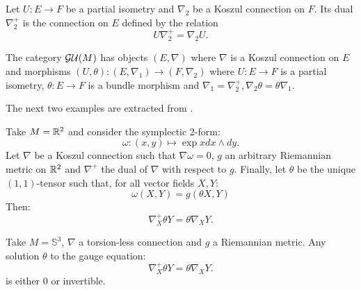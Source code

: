 \begin{defn}
\label{def:general_dual_connections}
Let $U \colon E \to F$ be a partial isometry and $\nabla_2$ be a Koszul connection on $F$. Its dual $\nabla_2^+$ is the connection on $E$ defined by the relation
\begin{equation}
    \label{eq:general_dual_connections}
    U \nabla_2^+ = \nabla_2 U.
\end{equation}
\end{defn}
\begin{defn}
    \label{def:category_gauge_dual}
    The category $\mathcal{GU}(M)$ has objects $(E,\nabla)$ where $\nabla$ is a Koszul connection on $E$ and morphisms $(U, \theta) \colon (E, \nabla_1) \to (F, \nabla_2)$ where $U \colon E \to F$ is a partial isometry, $\theta \colon E \to F$ is a bundle morphism and $\nabla_1 = \nabla_2^+, \nabla_2 \theta = \theta \nabla_1.$
\end{defn}
The next two examples are extracted from \cite{boyom2024}. 
\begin{ex}
    Take $M = \mathbb{R}^2$ and consider the symplectic 2-form:
    \begin{equation}
        \omega \colon (x,y) \mapsto \exp{x} dx \wedge dy.
    \end{equation}
    Let $\nabla$ be a Koszul connection such that $\nabla \omega = 0$, $g$ an arbitrary Riemannian metric on $\mathbb{R}^2$ and $\nabla^+$ the dual of $\nabla$ with respect to $g$. Finally, let $\theta$ be the unique $(1,1)$-tensor such that, for all vector fields $X,Y$:
    \begin{equation}
        \omega(X,Y) = g(\theta X, Y)
    \end{equation}
    Then:
    \begin{equation}
        \nabla^+_X \theta Y = \theta \nabla_X Y. 
    \end{equation}
\end{ex}
\begin{ex}
    Take $M=\mathbb{S}^3$, $\nabla$ a torsion-less connection and $g$ a Riemannian metric. Any solution $\theta$ to the gauge equation:
    \begin{equation}
        \nabla^+_X \theta Y = \theta \nabla_X Y. 
    \end{equation}
    is either 0 or invertible.
\end{ex}

